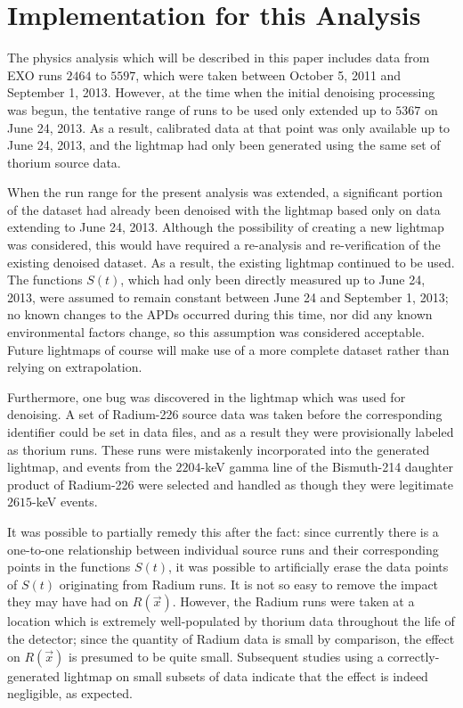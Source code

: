 \section{Implementation for this Analysis}

The physics analysis which will be described in this paper includes data from EXO runs $2464$ to $5597$, which were taken between October 5, 2011 and September 1, 2013.  However, at the time when the initial denoising processing was begun, the tentative range of runs to be used only extended up to $5367$ on June 24, 2013.  As a result, calibrated data at that point was only available up to June 24, 2013, and the lightmap had only been generated using the same set of thorium source data.

When the run range for the present analysis was extended, a significant portion of the dataset had already been denoised with the lightmap based only on data extending to June 24, 2013.  Although the possibility of creating a new lightmap was considered, this would have required a re-analysis and re-verification of the existing denoised dataset.  As a result, the existing lightmap continued to be used.  The functions $S(t)$, which had only been directly measured up to June 24, 2013, were assumed to remain constant between June 24 and September 1, 2013; no known changes to the APDs occurred during this time, nor did any known environmental factors change, so this assumption was considered acceptable.  Future lightmaps of course will make use of a more complete dataset rather than relying on extrapolation.

Furthermore, one bug was discovered in the lightmap which was used for denoising.  A set of Radium-226 source data was taken before the corresponding identifier could be set in data files, and as a result they were provisionally labeled as thorium runs.  These runs were mistakenly incorporated into the generated lightmap, and events from the $2204$-keV gamma line of the Bismuth-214 daughter product of Radium-226 were selected and handled as though they were legitimate $2615$-keV events.

It was possible to partially remedy this after the fact: since currently there is a one-to-one relationship between individual source runs and their corresponding points in the functions $S(t)$, it was possible to artificially erase the data points of $S(t)$ originating from Radium runs.  It is not so easy to remove the impact they may have had on $R(\vec{x})$.  However, the Radium runs were taken at a location which is extremely well-populated by thorium data throughout the life of the detector; since the quantity of Radium data is small by comparison, the effect on $R(\vec{x})$ is presumed to be quite small.  Subsequent studies using a correctly-generated lightmap on small subsets of data indicate that the effect is indeed negligible, as expected.

